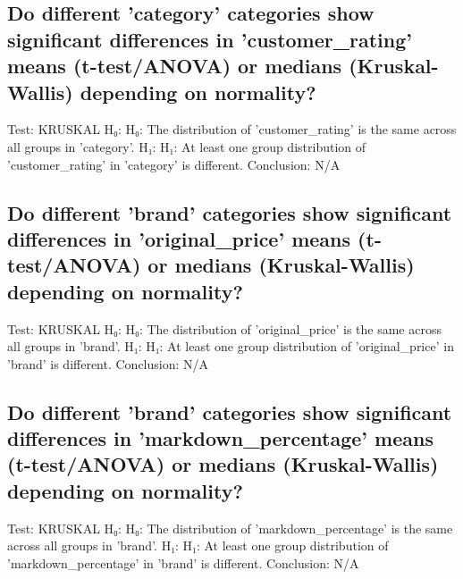 \documentclass{article}%
\begin{document}
%
\subsection{Do different 'category' categories show significant differences in 'customer\_rating' means (t{-}test/ANOVA) or medians (Kruskal{-}Wallis) depending on normality?}%
\label{subsec:Dodifferentcategorycategoriesshowsignificantdifferencesincustomerratingmeans(t{-}test/ANOVA)ormedians(Kruskal{-}Wallis)dependingonnormality?}%
Test: KRUSKAL\newline%
H₀: H₀: The distribution of 'customer\_rating' is the same across all groups in 'category'.\newline%
H₁: H₁: At least one group distribution of 'customer\_rating' in 'category' is different.\newline%
Conclusion: N/A

%
\subsection{Do different 'brand' categories show significant differences in 'original\_price' means (t{-}test/ANOVA) or medians (Kruskal{-}Wallis) depending on normality?}%
\label{subsec:Dodifferentbrandcategoriesshowsignificantdifferencesinoriginalpricemeans(t{-}test/ANOVA)ormedians(Kruskal{-}Wallis)dependingonnormality?}%
Test: KRUSKAL\newline%
H₀: H₀: The distribution of 'original\_price' is the same across all groups in 'brand'.\newline%
H₁: H₁: At least one group distribution of 'original\_price' in 'brand' is different.\newline%
Conclusion: N/A

%
\subsection{Do different 'brand' categories show significant differences in 'markdown\_percentage' means (t{-}test/ANOVA) or medians (Kruskal{-}Wallis) depending on normality?}%
\label{subsec:Dodifferentbrandcategoriesshowsignificantdifferencesinmarkdownpercentagemeans(t{-}test/ANOVA)ormedians(Kruskal{-}Wallis)dependingonnormality?}%
Test: KRUSKAL\newline%
H₀: H₀: The distribution of 'markdown\_percentage' is the same across all groups in 'brand'.\newline%
H₁: H₁: At least one group distribution of 'markdown\_percentage' in 'brand' is different.\newline%
Conclusion: N/A
\end{document}
